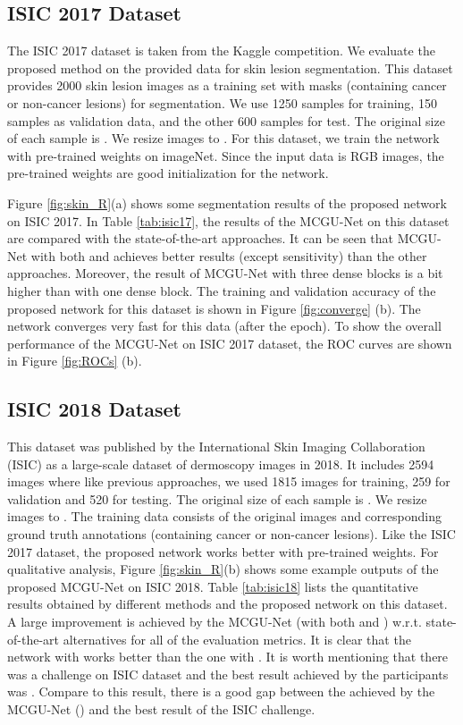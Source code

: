 \documentclass[journal]{IEEEtran}
\begin{document}
\subsection{ISIC 2017 Dataset}
The ISIC 2017 dataset \cite{codella2018skin} is taken from the Kaggle competition. We evaluate the proposed method on the provided data for skin lesion segmentation. This dataset provides 2000 skin lesion images as a training set with masks (containing cancer or non-cancer lesions) for segmentation. We use 1250 samples for training, 150 samples as validation data, and the other 600 samples for test. The original size of each sample is . We resize images to . For this dataset, we train the network with pre-trained weights on imageNet. Since the input data is RGB images, the pre-trained weights are good initialization for the network.

Figure \ref{fig:skin_R}(a) shows some segmentation results of the proposed network on ISIC 2017. In Table \ref{tab:isic17}, the results of the MCGU-Net on this dataset are compared with the state-of-the-art approaches. It can be seen that MCGU-Net with both  and  achieves better results (except sensitivity) than the other approaches. Moreover, the result of MCGU-Net with three dense blocks is a bit higher than with one dense block. 
The training and validation accuracy of the proposed network for this dataset is shown in Figure \ref{fig:converge} (b). The network converges very fast for this data (after the  epoch). To show the overall performance of the MCGU-Net on ISIC 2017 dataset, the ROC curves are shown in Figure \ref{fig:ROCs} (b).




\subsection{ISIC 2018 Dataset}
This dataset \cite{codella2019skin} was published by the International Skin Imaging Collaboration (ISIC) as a large-scale dataset of dermoscopy images in 2018. It includes 2594 images where like previous approaches\cite{alom2018}, we used 1815 images for training, 259 for validation and 520 for testing.
The original size of each sample is . We resize images to . The training data consists of the original images and corresponding ground truth annotations (containing cancer or non-cancer lesions). Like the ISIC 2017 dataset, the proposed network works better with pre-trained weights. 
For qualitative analysis, Figure \ref{fig:skin_R}(b) shows some example outputs of the proposed MCGU-Net on ISIC 2018. 
Table \ref{tab:isic18} lists the quantitative results obtained by different methods and the proposed network on this dataset. A large improvement is achieved by the MCGU-Net (with both  and ) w.r.t. state-of-the-art alternatives for all of the evaluation metrics. It is clear that the network with  works better than the one with .
It is worth mentioning that there was a challenge on ISIC dataset and the best result achieved by the participants was . Compare to this result, there is a good gap between the  achieved by the MCGU-Net () and the best result of the ISIC challenge.
\end{document}
